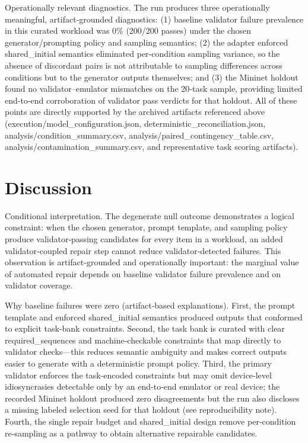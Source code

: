 \documentclass[conference]{IEEEtran}
\begin{document}
Operationally relevant diagnostics. The run produces three operationally meaningful, artifact‑grounded diagnostics: (1) baseline validator failure prevalence in this curated workload was 0\% (200/200 passes) under the chosen generator/prompting policy and sampling semantics; (2) the adapter enforced shared\_initial semantics eliminated per‑condition sampling variance, so the absence of discordant pairs is not attributable to sampling differences across conditions but to the generator outputs themselves; and (3) the Mininet holdout found no validator--emulator mismatches on the 20‑task sample, providing limited end‑to‑end corroboration of validator pass verdicts for that holdout. All of these points are directly supported by the archived artifacts referenced above (execution/model\_configuration.json, deterministic\_reconciliation.json, analysis/condition\_summary.csv, analysis/paired\_contingency\_table.csv, analysis/contamination\_summary.csv, and representative task scoring artifacts).

\section{Discussion}
Conditional interpretation. The degenerate null outcome demonstrates a logical constraint: when the chosen generator, prompt template, and sampling policy produce validator‑passing candidates for every item in a workload, an added validator‑coupled repair step cannot reduce validator‑detected failures. This observation is artifact‑grounded and operationally important: the marginal value of automated repair depends on baseline validator failure prevalence and on validator coverage.

Why baseline failures were zero (artifact‑based explanations). First, the prompt template and enforced shared\_initial semantics produced outputs that conformed to explicit task‑bank constraints. Second, the task bank is curated with clear required\_sequences and machine‑checkable constraints that map directly to validator checks---this reduces semantic ambiguity and makes correct outputs easier to generate with a deterministic prompt policy. Third, the primary validator enforces the task‑encoded constraints but may omit device‑level idiosyncrasies detectable only by an end‑to‑end emulator or real device; the recorded Mininet holdout produced zero disagreements but the run also discloses a missing labeled selection seed for that holdout (see reproducibility note). Fourth, the single repair budget and shared\_initial design remove per‑condition re‑sampling as a pathway to obtain alternative repairable candidates.
\end{document}
